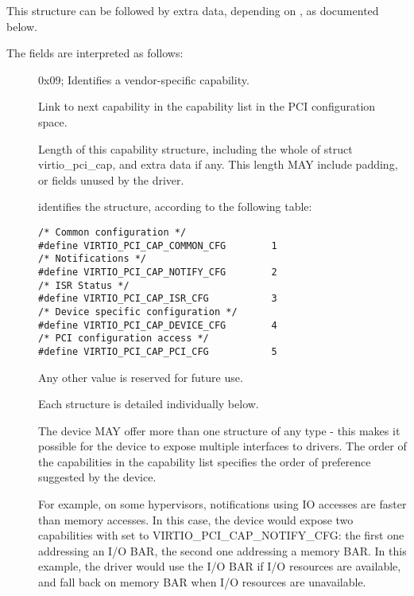 This structure can be followed by extra data, depending on
, as documented below.

The fields are interpreted as follows:

\begin{description}
\item[]
        0x09; Identifies a vendor-specific capability.

\item[]
        Link to next capability in the capability list in the PCI configuration space.

\item[]
        Length of this capability structure, including the whole of
        struct virtio_pci_cap, and extra data if any.
        This length MAY include padding, or fields unused by the driver.

\item[]
        identifies the structure, according to the following table:

\begin{lstlisting}
/* Common configuration */
#define VIRTIO_PCI_CAP_COMMON_CFG        1
/* Notifications */
#define VIRTIO_PCI_CAP_NOTIFY_CFG        2
/* ISR Status */
#define VIRTIO_PCI_CAP_ISR_CFG           3
/* Device specific configuration */
#define VIRTIO_PCI_CAP_DEVICE_CFG        4
/* PCI configuration access */
#define VIRTIO_PCI_CAP_PCI_CFG           5
\end{lstlisting}

        Any other value is reserved for future use.

        Each structure is detailed individually below.

        The device MAY offer more than one structure of any type - this makes it
        possible for the device to expose multiple interfaces to drivers.  The order of
        the capabilities in the capability list specifies the order of preference
        suggested by the device.
        \begin{note}
          For example, on some hypervisors, notifications using IO accesses are
        faster than memory accesses. In this case, the device would expose two
        capabilities with  set to VIRTIO_PCI_CAP_NOTIFY_CFG:
        the first one addressing an I/O BAR, the second one addressing a memory BAR.
        In this example, the driver would use the I/O BAR if I/O resources are available, and fall back on
        memory BAR when I/O resources are unavailable.
        \end{note}


\end{description}
